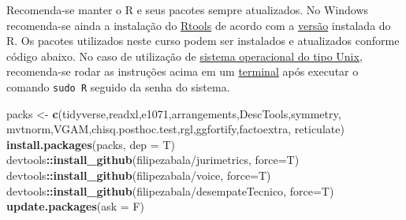 \documentclass[
]{book}
\newenvironment{Shaded}{\begin{snugshade}}{\end{snugshade}}
\newcommand{\DataTypeTok}[1]{\textcolor[rgb]{0.13,0.29,0.53}{#1}}
\newcommand{\KeywordTok}[1]{\textcolor[rgb]{0.13,0.29,0.53}{\textbf{#1}}}
\newcommand{\NormalTok}[1]{#1}
\newcommand{\OperatorTok}[1]{\textcolor[rgb]{0.81,0.36,0.00}{\textbf{#1}}}
\newcommand{\StringTok}[1]{\textcolor[rgb]{0.31,0.60,0.02}{#1}}
\theoremstyle{definition}
\theoremstyle{definition}
\theoremstyle{definition}
\theoremstyle{remark}
\begin{document}
Recomenda-se manter o R e seus pacotes sempre atualizados. No Windows recomenda-se ainda a instalação do \href{https://cran.r-project.org/bin/windows/Rtools/}{Rtools} de acordo com a \href{https://cran.r-project.org/bin/windows/Rtools/history.html}{versão} instalada do R. Os pacotes utilizados neste curso podem ser instalados e atualizados conforme código abaixo. No caso de utilização de \href{https://pt.wikipedia.org/wiki/Sistema_operacional_tipo_Unix}{sistema operacional do tipo Unix}, recomenda-se rodar as instruções acima em um \href{https://en.wikipedia.org/wiki/List_of_terminal_emulators}{terminal} após executar o comando \texttt{sudo\ R} seguido da senha do sistema.

\begin{Shaded}
\begin{Highlighting}[]
\NormalTok{packs \textless{}{-}}\StringTok{ }\KeywordTok{c}\NormalTok{(}\StringTok{\textquotesingle{}tidyverse\textquotesingle{}}\NormalTok{,}\StringTok{\textquotesingle{}readxl\textquotesingle{}}\NormalTok{,}\StringTok{\textquotesingle{}e1071\textquotesingle{}}\NormalTok{,}\StringTok{\textquotesingle{}arrangements\textquotesingle{}}\NormalTok{,}\StringTok{\textquotesingle{}DescTools\textquotesingle{}}\NormalTok{,}\StringTok{\textquotesingle{}symmetry\textquotesingle{}}\NormalTok{,}
           \StringTok{\textquotesingle{}mvtnorm\textquotesingle{}}\NormalTok{,}\StringTok{\textquotesingle{}VGAM\textquotesingle{}}\NormalTok{,}\StringTok{\textquotesingle{}chisq.posthoc.test\textquotesingle{}}\NormalTok{,}\StringTok{\textquotesingle{}rgl\textquotesingle{}}\NormalTok{,}\StringTok{\textquotesingle{}ggfortify\textquotesingle{}}\NormalTok{,}\StringTok{\textquotesingle{}factoextra\textquotesingle{}}\NormalTok{,}
           \StringTok{\textquotesingle{}reticulate\textquotesingle{}}\NormalTok{)}
\KeywordTok{install.packages}\NormalTok{(packs, }\DataTypeTok{dep =}\NormalTok{ T)}
\NormalTok{devtools}\OperatorTok{::}\KeywordTok{install\_github}\NormalTok{(}\StringTok{\textquotesingle{}filipezabala/jurimetrics\textquotesingle{}}\NormalTok{, }\DataTypeTok{force=}\NormalTok{T)}
\NormalTok{devtools}\OperatorTok{::}\KeywordTok{install\_github}\NormalTok{(}\StringTok{\textquotesingle{}filipezabala/voice\textquotesingle{}}\NormalTok{, }\DataTypeTok{force=}\NormalTok{T)}
\NormalTok{devtools}\OperatorTok{::}\KeywordTok{install\_github}\NormalTok{(}\StringTok{\textquotesingle{}filipezabala/desempateTecnico\textquotesingle{}}\NormalTok{, }\DataTypeTok{force=}\NormalTok{T)}
\KeywordTok{update.packages}\NormalTok{(}\DataTypeTok{ask =}\NormalTok{ F)}
\end{Highlighting}
\end{Shaded}
\end{document}
